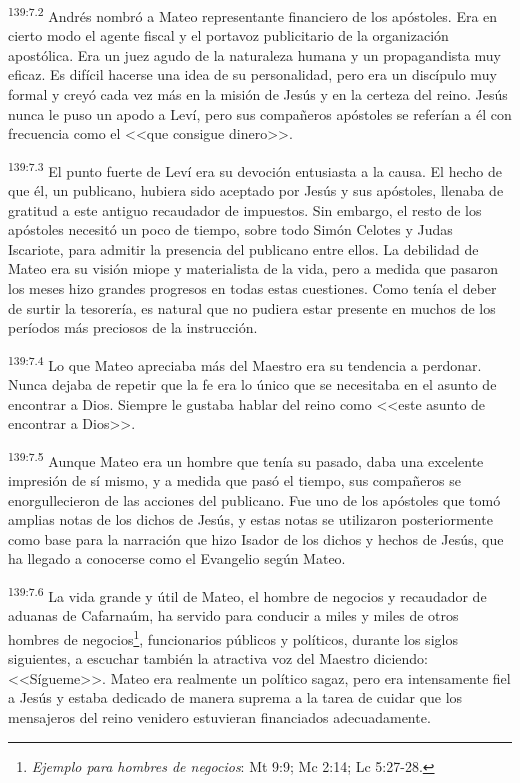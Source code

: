 \par 
\textsuperscript{139:7.2} Andrés nombró a Mateo representante financiero de los apóstoles. Era en cierto modo el agente fiscal y el portavoz publicitario de la organización apostólica. Era un juez agudo de la naturaleza humana y un propagandista muy eficaz. Es difícil hacerse una idea de su personalidad, pero era un discípulo muy formal y creyó cada vez más en la misión de Jesús y en la certeza del reino. Jesús nunca le puso un apodo a Leví, pero sus compañeros apóstoles se referían a él con frecuencia como el <<que consigue dinero>>.

\par 
\textsuperscript{139:7.3} El punto fuerte de Leví era su devoción entusiasta a la causa. El hecho de que él, un publicano, hubiera sido aceptado por Jesús y sus apóstoles, llenaba de gratitud a este antiguo recaudador de impuestos. Sin embargo, el resto de los apóstoles necesitó un poco de tiempo, sobre todo Simón Celotes y Judas Iscariote, para admitir la presencia del publicano entre ellos. La debilidad de Mateo era su visión miope y materialista de la vida, pero a medida que pasaron los meses hizo grandes progresos en todas estas cuestiones. Como tenía el deber de surtir la tesorería, es natural que no pudiera estar presente en muchos de los períodos más preciosos de la instrucción.

\par 
\textsuperscript{139:7.4} Lo que Mateo apreciaba más del Maestro era su tendencia a perdonar. Nunca dejaba de repetir que la fe era lo único que se necesitaba en el asunto de encontrar a Dios. Siempre le gustaba hablar del reino como <<este asunto de encontrar a Dios>>.

\par 
\textsuperscript{139:7.5} Aunque Mateo era un hombre que tenía su pasado, daba una excelente impresión de sí mismo, y a medida que pasó el tiempo, sus compañeros se enorgullecieron de las acciones del publicano. Fue uno de los apóstoles que tomó amplias notas de los dichos de Jesús, y estas notas se utilizaron posteriormente como base para la narración que hizo Isador de los dichos y hechos de Jesús, que ha llegado a conocerse como el Evangelio según Mateo.

\par 
\textsuperscript{139:7.6} La vida grande y útil de Mateo, el hombre de negocios y recaudador de aduanas de Cafarnaúm, ha servido para conducir a miles y miles de otros hombres de negocios\footnote{\textit{Ejemplo para hombres de negocios}: Mt 9:9; Mc 2:14; Lc 5:27-28.}, funcionarios públicos y políticos, durante los siglos siguientes, a escuchar también la atractiva voz del Maestro diciendo: <<Sígueme>>. Mateo era realmente un político sagaz, pero era intensamente fiel a Jesús y estaba dedicado de manera suprema a la tarea de cuidar que los mensajeros del reino venidero estuvieran financiados adecuadamente.

